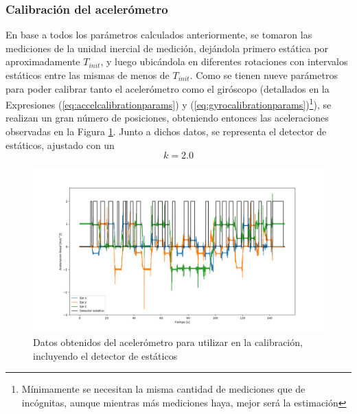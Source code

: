 \subsubsection{Calibración del acelerómetro}
En base a todos los parámetros calculados anteriormente, se tomaron las mediciones de la unidad inercial de medición, dejándola primero estática por aproximadamente $T_{init}$, y luego ubicándola en diferentes rotaciones con intervalos estáticos entre las mismas de menos de $T_{init}$. Como se tienen nueve parámetros para poder calibrar tanto el acelerómetro como el giróscopo (detallados en la Expresiones (\ref{eq:accelcalibrationparams}) y (\ref{eq:gyrocalibrationparams})\footnote{Mínimamente se necesitan la misma cantidad de mediciones que de incógnitas, aunque mientras más mediciones haya, mejor será la estimación}), se realizan un gran número de posiciones, obteniendo entonces las aceleraciones observadas en la Figura \ref{fig:imugyroaccelcal}. Junto a dichos datos, se representa el detector de estáticos, ajustado con un
\begin{equation}
    k = 2.0
\end{equation}
\begin{figure}
    \centering
    \includegraphics[width=\textwidth]{Img/IMUGyroAccelCal.png}
    \caption{Datos obtenidos del acelerómetro para utilizar en la calibración, incluyendo el detector de estáticos}
    \label{fig:imugyroaccelcal}
\end{figure}

